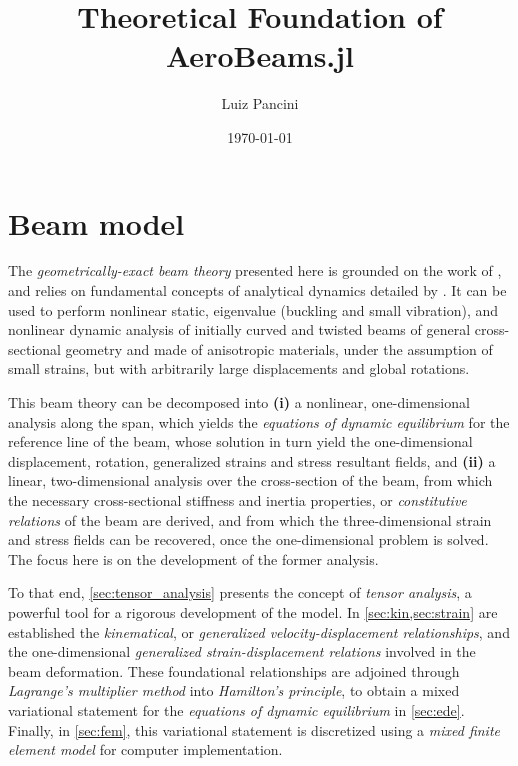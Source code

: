 \documentclass[12pt,a4paper,oneside,english]{abntex2} %
\title{Theoretical Foundation of AeroBeams.jl}
\author{Luiz Pancini}
\date{\today}
\begin{document}
\maketitle
\tableofcontents

\chapter[Beam model]{Beam model}
\label{ch:beam_model}

The \textit{geometrically-exact beam theory} presented here is grounded on the work of , and relies on fundamental concepts of analytical dynamics detailed by . It can be used to perform nonlinear static, eigenvalue (buckling and small vibration), and nonlinear dynamic analysis of initially curved and twisted beams of general cross-sectional geometry and made of anisotropic materials, under the assumption of small strains, but with arbitrarily large displacements and global rotations. 

This beam theory can be decomposed into \textbf{(i)} a nonlinear, one-dimensional analysis along the span, which yields the \textit{equations of dynamic equilibrium} for the reference line of the beam, whose solution in turn yield the one-dimensional displacement, rotation, generalized strains and stress resultant fields, and \textbf{(ii)} a linear, two-dimensional analysis over the cross-section of the beam, from which the necessary cross-sectional stiffness and inertia properties, or \textit{constitutive relations} of the beam are derived, and from which the three-dimensional strain and stress fields can be recovered, once the one-dimensional problem is solved. The focus here is on the development of the former analysis.

To that end, \cref{sec:tensor_analysis} presents the concept of \textit{tensor analysis}, a powerful tool for a rigorous development of the model. In \cref{sec:kin,sec:strain} are established the \textit{kinematical}, or \textit{generalized velocity-displacement relationships}, and the one-dimensional \textit{generalized strain-displacement relations} involved in the beam deformation. These foundational relationships are adjoined through \textit{Lagrange's multiplier method} into \textit{Hamilton's principle}, to obtain a mixed variational statement for the \textit{equations of dynamic equilibrium} in \cref{sec:ede}. Finally, in \cref{sec:fem}, this variational statement is discretized using a \textit{mixed finite element model} for computer implementation.
\end{document}
